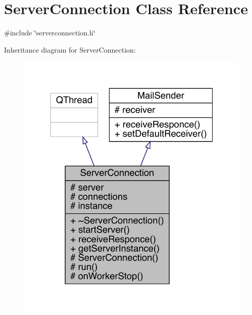 \hypertarget{a00181}{}\section{Server\+Connection Class Reference}
\label{a00181}


{\ttfamily \#include \char`\"{}serverconnection.\+h\char`\"{}}



Inheritance diagram for Server\+Connection\+:
\nopagebreak
\begin{figure}[H]
\begin{center}
\leavevmode
\includegraphics[width=324pt]{d0/d81/a00180}
\end{center}
\end{figure}


